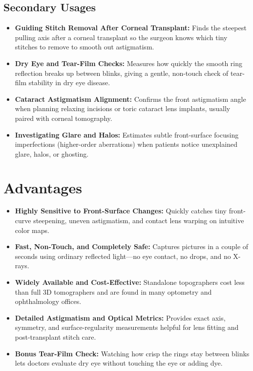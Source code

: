 \subsection{Secondary Usages}
\begin{itemize}
    \item \textbf{Guiding Stitch Removal After Corneal Transplant:} Finds the steepest pulling axis after a corneal transplant so the surgeon knows which tiny stitches to remove to smooth out astigmatism.
    \item \textbf{Dry Eye and Tear-Film Checks:} Measures how quickly the smooth ring reflection breaks up between blinks, giving a gentle, non-touch check of tear-film stability in dry eye disease.
    \item \textbf{Cataract Astigmatism Alignment:} Confirms the front astigmatism angle when planning relaxing incisions or toric cataract lens implants, usually paired with corneal tomography.
    \item \textbf{Investigating Glare and Halos:} Estimates subtle front-surface focusing imperfections (higher-order aberrations) when patients notice unexplained glare, halos, or ghosting.
\end{itemize}

\section{Advantages}
\begin{itemize}
    \item \textbf{Highly Sensitive to Front-Surface Changes:} Quickly catches tiny front-curve steepening, uneven astigmatism, and contact lens warping on intuitive color maps.
    \item \textbf{Fast, Non-Touch, and Completely Safe:} Captures pictures in a couple of seconds using ordinary reflected light---no eye contact, no drops, and no X-rays.
    \item \textbf{Widely Available and Cost-Effective:} Standalone topographers cost less than full 3D tomographers and are found in many optometry and ophthalmology offices.
    \item \textbf{Detailed Astigmatism and Optical Metrics:} Provides exact axis, symmetry, and surface-regularity measurements helpful for lens fitting and post-transplant stitch care.
    \item \textbf{Bonus Tear-Film Check:} Watching how crisp the rings stay between blinks lets doctors evaluate dry eye without touching the eye or adding dye.
\end{itemize}

